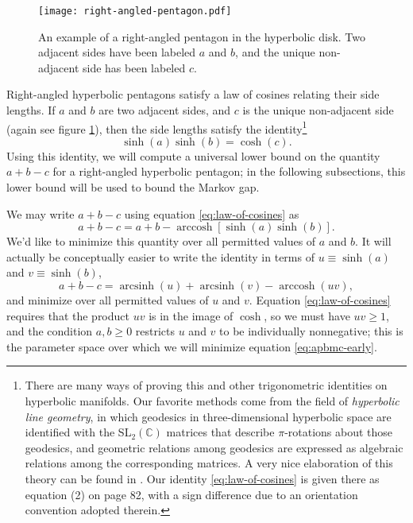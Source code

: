 \documentclass[a4paper,11pt]{article}
\newcommand{\arccosh}{\operatorname{arccosh}}
\newcommand{\arcsinh}{\operatorname{arcsinh}}
\begin{document}
\begin{figure}
    \centering
    \texttt{[image: right-angled-pentagon.pdf]}
    \caption{An example of a right-angled pentagon in the hyperbolic disk. Two adjacent sides have been labeled $a$ and $b$, and the unique non-adjacent side has been labeled $c$.}
    \label{fig:right-angled-pentagon}
\end{figure}

Right-angled hyperbolic pentagons satisfy a law of cosines relating their side lengths. If $a$ and $b$ are two adjacent sides, and $c$ is the unique non-adjacent side (again see figure \ref{fig:right-angled-pentagon}), then the side lengths satisfy the identity\footnote{There are many ways of proving this and other trigonometric identities on hyperbolic manifolds. Our favorite methods come from the field of \emph{hyperbolic line geometry}, in which geodesics in three-dimensional hyperbolic space are identified with the SL$_2(\mathbb{C})$ matrices that describe $\pi$-rotations about those geodesics, and geometric relations among geodesics are expressed as algebraic relations among the corresponding matrices. A very nice elaboration of this theory can be found in \cite{fenchel}. Our identity \eqref{eq:law-of-cosines} is given there as equation (2) on page 82, with a sign difference due to an orientation convention adopted therein.}
\begin{equation} \label{eq:law-of-cosines}
    \sinh(a) \sinh(b) = \cosh(c).
\end{equation}
Using this identity, we will compute a universal lower bound on the quantity $a + b - c$ for a right-angled hyperbolic pentagon; in the following subsections, this lower bound will be used to bound the Markov gap.

We may write $a + b - c$ using equation \eqref{eq:law-of-cosines} as
\begin{equation}
    a + b - c
        = a + b - \arccosh[\sinh(a) \sinh(b)].
\end{equation}
We'd like to minimize this quantity over all permitted values of $a$ and $b$. It will actually be conceptually easier to write the identity in terms of $u \equiv \sinh(a)$ and $v \equiv \sinh(b)$,
\begin{equation} \label{eq:apbmc-early}
    a + b - c = \arcsinh(u) + \arcsinh(v) - \arccosh(u v),
\end{equation}
and minimize over all permitted values of $u$ and $v$. Equation \eqref{eq:law-of-cosines} requires that the product $u v$ is in the image of $\cosh$, so we must have $u v \geq 1$, and the condition $a, b \geq 0$ restricts $u$ and $v$ to be individually nonnegative; this is the parameter space over which we will minimize equation \eqref{eq:apbmc-early}.
\end{document}
